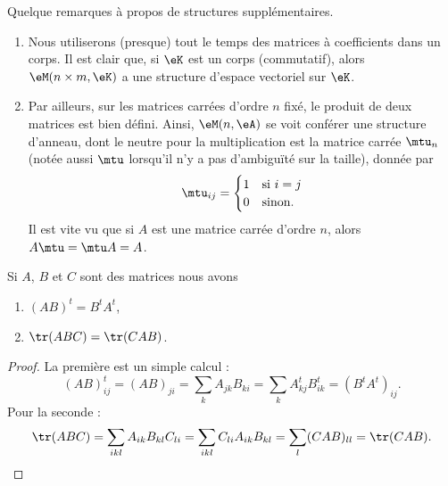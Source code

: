\begin{remark}
    Quelque remarques à propos de structures supplémentaires.
\begin{enumerate}
    \item Nous utiliserons (presque) tout le temps des matrices à coefficients dans un corps. Il est clair que, si \( \eK \) est un corps (commutatif), alors \( \eM(n\times m,\eK) \) a une structure d'espace vectoriel sur \( \eK \).
    \item Par ailleurs, sur les matrices carrées d'ordre \( n \) fixé, le produit de deux matrices est bien défini. Ainsi, \( \eM(n,\eA)\) se voit conférer une structure d'anneau, dont le neutre pour la multiplication est la matrice carrée \( \mtu_n\) (notée aussi \( \mtu\) lorsqu'il n'y a pas d'ambiguïté sur la taille), donnée par
\begin{equation}
    \mtu_{ij}=\begin{cases}
        1    &   \text{si } i=j\\
        0    &    \text{sinon.}
    \end{cases}
\end{equation}
Il est vite vu que si \( A\) est une matrice carrée d'ordre \( n \), alors \( A\mtu=\mtu A=A\).
\end{enumerate}
\end{remark}

\begin{lemma}        \label{LEMooUXDRooWZbMVN}
    Si \( A\), \( B\) et \( C\) sont des matrices nous avons
    \begin{enumerate}
        \item
            \( (AB)^t=B^tA^t\),
        \item       \label{ITEMooXDYQooAlnArd}
            \( \tr(ABC)=\tr(CAB)\).
    \end{enumerate}
\end{lemma}

\begin{proof}
    La première est un simple calcul :
    \begin{equation}
        (AB)^t_{ij}=(AB)_{ji}=\sum_kA_{jk}B_{ki}=\sum_kA^t_{kj}B^t_{ik}=(B^tA^t)_{ij}.
    \end{equation}
    Pour la seconde :
    \begin{equation}
        \tr(ABC)=\sum_{ikl}A_{ik}B_{kl}C_{li}=\sum_{ikl}C_{li}A_{ik}B_{kl}=\sum_l(CAB)_{ll}=\tr(CAB).
    \end{equation}
\end{proof}

